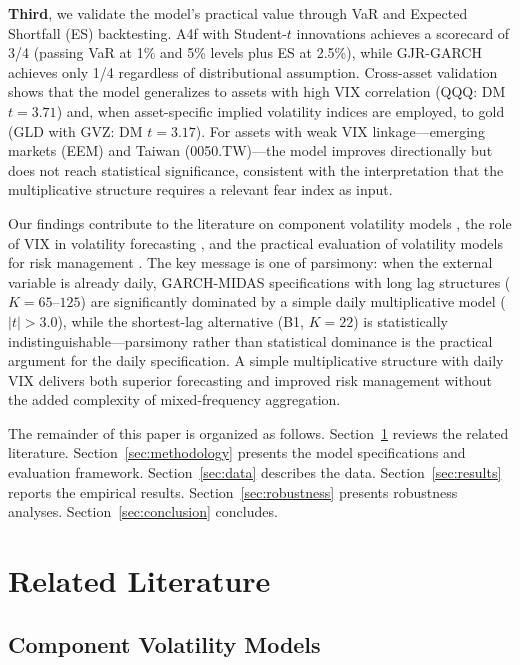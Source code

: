 \documentclass[12pt,a4paper]{article}
\begin{document}
\textbf{Third}, we validate the model's practical value through VaR and Expected Shortfall (ES) backtesting. A4f with Student-$t$ innovations achieves a scorecard of 3/4 (passing VaR at 1\% and 5\% levels plus ES at 2.5\%), while GJR-GARCH achieves only 1/4 regardless of distributional assumption. Cross-asset validation shows that the model generalizes to assets with high VIX correlation (QQQ: DM $t = 3.71$) and, when asset-specific implied volatility indices are employed, to gold (GLD with GVZ: DM $t = 3.17$). For assets with weak VIX linkage---emerging markets (EEM) and Taiwan (0050.TW)---the model improves directionally but does not reach statistical significance, consistent with the interpretation that the multiplicative structure requires a relevant fear index as input.

Our findings contribute to the literature on component volatility models \citep{engle2008, engle2013, conrad2015, conrad2020}, the role of VIX in volatility forecasting \citep{bekaert2014}, and the practical evaluation of volatility models for risk management \citep{patton2011, hansen2011}. The key message is one of parsimony: when the external variable is already daily, GARCH-MIDAS specifications with long lag structures ($K = 65$--$125$) are significantly dominated by a simple daily multiplicative model ($|t| > 3.0$), while the shortest-lag alternative (B1, $K=22$) is statistically indistinguishable---parsimony rather than statistical dominance is the practical argument for the daily specification. A simple multiplicative structure with daily VIX delivers both superior forecasting and improved risk management without the added complexity of mixed-frequency aggregation.

The remainder of this paper is organized as follows. Section~\ref{sec:literature} reviews the related literature. Section~\ref{sec:methodology} presents the model specifications and evaluation framework. Section~\ref{sec:data} describes the data. Section~\ref{sec:results} reports the empirical results. Section~\ref{sec:robustness} presents robustness analyses. Section~\ref{sec:conclusion} concludes.


\section{Related Literature}
\label{sec:literature}

\subsection{Component Volatility Models}
\end{document}
